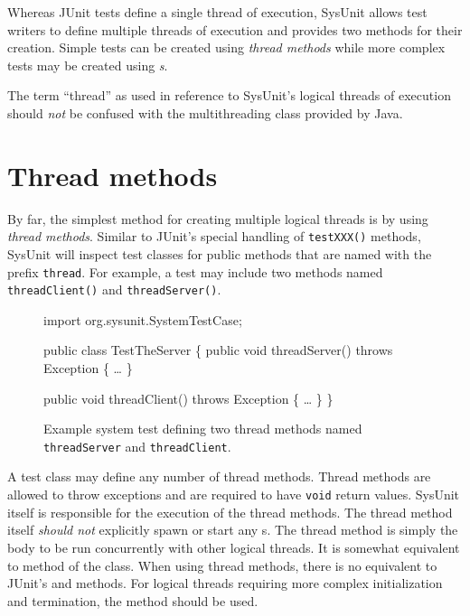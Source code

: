 Whereas JUnit tests define a single thread of execution, SysUnit
allows test writers to define multiple threads of execution and
provides two methods for their creation.  Simple tests can be
created using \emph{thread methods} while more complex
tests may be created using \emph{s}.

\begin{note}
The term ``thread'' as used in reference to SysUnit's logical
threads of execution should \emph{not} be confused with
the  multithreading class provided
by Java.
\end{note}

\section{Thread methods}

By far, the simplest method for creating multiple logical threads
is by using \emph{thread methods}.  Similar to JUnit's
special handling of \texttt{testXXX()} methods, SysUnit will
inspect test classes for public methods that are named with
the prefix \texttt{thread}.  For example, a test may include
two methods named \texttt{threadClient()} and \texttt{threadServer()}.

\begin{figure}
\begin{codelisting}
import org.sysunit.SystemTestCase;

public class TestTheServer
\{
    public void threadServer()
        throws Exception 
    \{
         \dots
    \}

    public void threadClient()
        throws Exception 
    \{
         \dots
    \}
\}
\caption{Example system test defining two thread methods named
\texttt{threadServer} and \texttt{threadClient}.}
\end{codelisting}
\end{figure}

A test class may define any number of thread methods.  Thread methods
are allowed to throw exceptions and are required to have \texttt{void}
return values.  SysUnit itself is responsible for the execution of
the thread methods.  The thread method itself \emph{should not}
explicitly spawn or start any s.  The thread method is
simply the body to be run concurrently with other logical threads.
It is somewhat equivalent to  method of the
 class.  When using thread methods, there is no
equivalent to JUnit's  and  
methods.  For logical threads requiring more complex initialization
and termination, the  method should be used.


